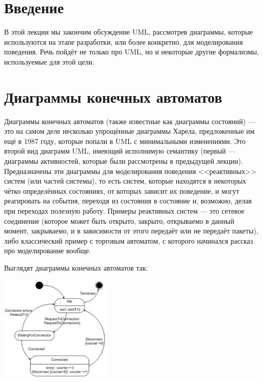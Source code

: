 \documentclass{../mcstext}
\begin{document}
\maketitle
\thispagestyle{empty}

\section{Введение}

В этой лекции мы закончим обсуждение UML, рассмотрев диаграммы, которые используются на этапе разработки, или более конкретно, для моделирования поведения. Речь пойдёт не только про UML, но и некоторые другие формализмы, используемые для этой цели.

\section{Диаграммы конечных автоматов}

Диаграммы конечных автоматов (также известные как диаграммы состояний) --- это на самом деле несколько упрощённые диаграммы Харела, предложенные им ещё в 1987 году, которые попали в UML с минимальными изменениями. Это второй вид диаграмм UML, имеющий исполнимую семантику (первый --- диаграммы активностей, которые были рассмотрены в предыдущей лекции). Предназначены эти диаграммы для моделирования поведения <<реактивных>> систем (или частей системы), то есть систем, которые находятся в некоторых чётко определённых состояниях, от которых зависит их поведение, и могут реагировать на события, переходя из состояния в состояние и, возможно, делая при переходах полезную работу. Примеры реактивных систем --- это сетевое соединение (которое может быть открыто, закрыто, открываемо в данный момент, закрываемо, и в зависимости от этого передаёт или не передаёт пакеты), либо классический пример с торговым автоматом, с которого начинался рассказ про моделирование вообще.

Выглядят диаграммы конечных автоматов так:

\begin{center}
    \includegraphics[width=0.4\textwidth]{stateTransitionExample.png}
\end{center}
\end{document}
